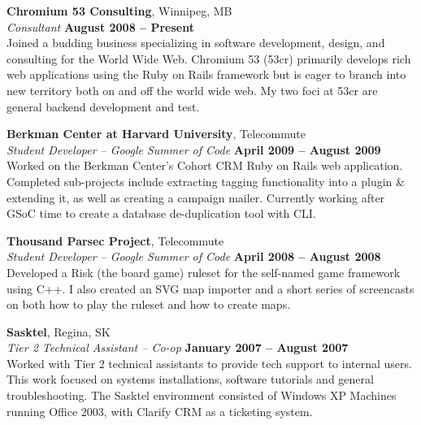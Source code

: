 \documentclass[margin,line,letterpaper]{resume}
\begin{document}
\begin{resume}
  {\bf Chromium 53 Consulting}, Winnipeg, MB \vspace{2mm}\\\vspace{1mm}%
  {\sl Consultant} \hfill {\bf August 2008 -- Present}\\
  Joined a budding business specializing in software development, design, and
  consulting for the World Wide Web. Chromium 53 (53cr) primarily develops rich web applications using the Ruby on Rails framework but is eager to branch into new territory both on and off the world wide web. My two foci at 53cr are general backend development and test.

  {\bf Berkman Center at Harvard University}, Telecommute \vspace{2mm}\\\vspace{1mm}%
  {\sl Student Developer -- Google Summer of Code } \hfill {\bf April 2009 -- August 2009}\\
  Worked on the Berkman Center's Cohort CRM Ruby on Rails web application. Completed sub-projects include extracting tagging functionality into a plugin \& extending it, as well as creating a campaign mailer. Currently working after GSoC time to create a database de-duplication tool with CLI.

{\bf Thousand Parsec Project}, Telecommute \vspace{2mm}\\\vspace{1mm}%
  {\sl Student Developer --  Google Summer of Code } \hfill {\bf April 2008 -- August 2008}\\
  Developed a Risk (the board game) ruleset for the self-named game framework using C++. I also created an SVG map importer and a short series of screencasts on both how to play the ruleset and how to create maps.

  {\bf Sasktel}, Regina, SK \vspace{2mm}\\\vspace{1mm}%
  {\sl Tier 2 Technical Assistant -- Co-op} \hfill {\bf January 2007 -- August 2007}\\
  Worked with Tier 2 technical assistants to provide tech support to internal users. This work focused on systems installations, software tutorials and general troubleshooting. The Sasktel environment consisted of Windows XP Machines running Office 2003, with Clarify CRM as a ticketing system.


\end{resume}
\end{document}

